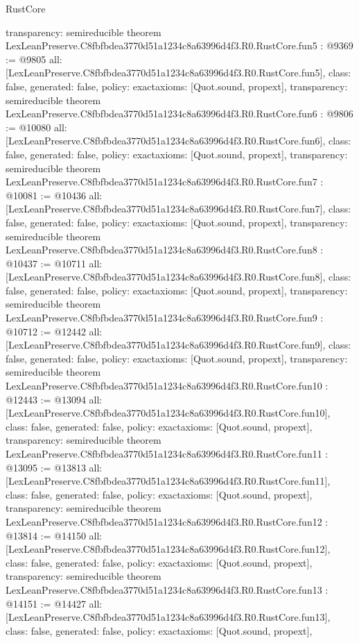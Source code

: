 \begin{lexlean}{RustCore}
\begin{coremodule}
{  transparency: semireducible
}
theorem LexLeanPreserve.C8fbfbdea3770d51a1234c8a63996d4f3.R0.RustCore.fun5 : @9369 := @9805 {
  all: [LexLeanPreserve.C8fbfbdea3770d51a1234c8a63996d4f3.R0.RustCore.fun5],
  class: false,
  generated: false,
  policy: exact{axioms: [Quot.sound, propext]},
  transparency: semireducible
}
theorem LexLeanPreserve.C8fbfbdea3770d51a1234c8a63996d4f3.R0.RustCore.fun6 : @9806 := @10080 {
  all: [LexLeanPreserve.C8fbfbdea3770d51a1234c8a63996d4f3.R0.RustCore.fun6],
  class: false,
  generated: false,
  policy: exact{axioms: [Quot.sound, propext]},
  transparency: semireducible
}
theorem LexLeanPreserve.C8fbfbdea3770d51a1234c8a63996d4f3.R0.RustCore.fun7 : @10081 := @10436 {
  all: [LexLeanPreserve.C8fbfbdea3770d51a1234c8a63996d4f3.R0.RustCore.fun7],
  class: false,
  generated: false,
  policy: exact{axioms: [Quot.sound, propext]},
  transparency: semireducible
}
theorem LexLeanPreserve.C8fbfbdea3770d51a1234c8a63996d4f3.R0.RustCore.fun8 : @10437 := @10711 {
  all: [LexLeanPreserve.C8fbfbdea3770d51a1234c8a63996d4f3.R0.RustCore.fun8],
  class: false,
  generated: false,
  policy: exact{axioms: [Quot.sound, propext]},
  transparency: semireducible
}
theorem LexLeanPreserve.C8fbfbdea3770d51a1234c8a63996d4f3.R0.RustCore.fun9 : @10712 := @12442 {
  all: [LexLeanPreserve.C8fbfbdea3770d51a1234c8a63996d4f3.R0.RustCore.fun9],
  class: false,
  generated: false,
  policy: exact{axioms: [Quot.sound, propext]},
  transparency: semireducible
}
theorem LexLeanPreserve.C8fbfbdea3770d51a1234c8a63996d4f3.R0.RustCore.fun10 : @12443 := @13094 {
  all: [LexLeanPreserve.C8fbfbdea3770d51a1234c8a63996d4f3.R0.RustCore.fun10],
  class: false,
  generated: false,
  policy: exact{axioms: [Quot.sound, propext]},
  transparency: semireducible
}
theorem LexLeanPreserve.C8fbfbdea3770d51a1234c8a63996d4f3.R0.RustCore.fun11 : @13095 := @13813 {
  all: [LexLeanPreserve.C8fbfbdea3770d51a1234c8a63996d4f3.R0.RustCore.fun11],
  class: false,
  generated: false,
  policy: exact{axioms: [Quot.sound, propext]},
  transparency: semireducible
}
theorem LexLeanPreserve.C8fbfbdea3770d51a1234c8a63996d4f3.R0.RustCore.fun12 : @13814 := @14150 {
  all: [LexLeanPreserve.C8fbfbdea3770d51a1234c8a63996d4f3.R0.RustCore.fun12],
  class: false,
  generated: false,
  policy: exact{axioms: [Quot.sound, propext]},
  transparency: semireducible
}
theorem LexLeanPreserve.C8fbfbdea3770d51a1234c8a63996d4f3.R0.RustCore.fun13 : @14151 := @14427 {
  all: [LexLeanPreserve.C8fbfbdea3770d51a1234c8a63996d4f3.R0.RustCore.fun13],
  class: false,
  generated: false,
  policy: exact{axioms: [Quot.sound, propext]},
}
\end{coremodule}
\end{lexlean}

